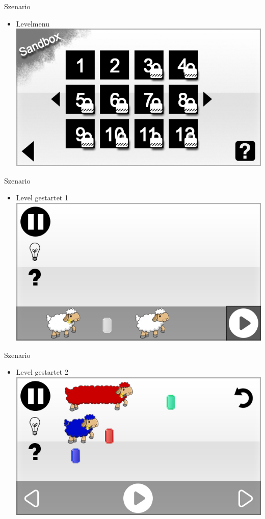 \documentclass[18pt]{beamer}
\begin{document}
\begin{frame}{Szenario}
\begin{itemize}
\item Levelmenu
\includegraphics[scale=0.5]{../gui/_jpeg/level}
\end{itemize}
\end{frame}

\begin{frame}{Szenario}
\begin{itemize}
\item Level gestartet 1 
\includegraphics[scale=0.5]{../gui/_jpeg/game_freemode}
\end{itemize}
\end{frame}

\begin{frame}{Szenario}
\begin{itemize}
\item Level gestartet 2
\includegraphics[scale=0.5]{../gui/_jpeg/game_play_started}
\end{itemize}
\end{frame}
\end{document}
